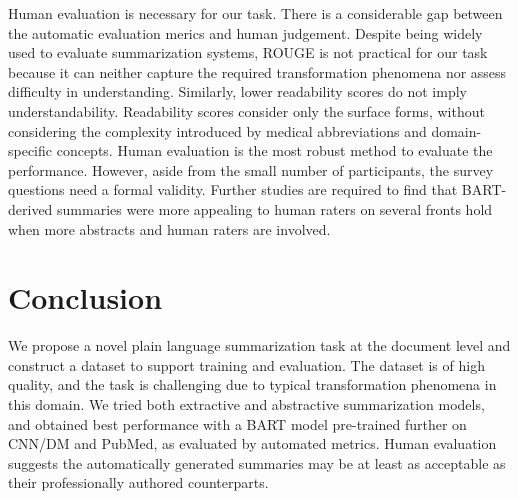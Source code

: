 \documentclass[letterpaper, table]{article} %
\begin{document}
Human evaluation is necessary for our task.
There is a considerable gap between the automatic evaluation merics 
and human judgement. 
Despite being widely used to evaluate summarization systems, ROUGE is not practical for our task because it can neither capture the required transformation phenomena nor assess difficulty in understanding. 
Similarly, lower readability scores do not imply understandability. 
Readability scores consider only the surface forms,
without considering the complexity introduced by medical abbreviations and domain-specific concepts. 
Human evaluation is the most robust method to evaluate the performance. 
However, aside from the small number of participants, 
the survey questions need a formal validity.
Further studies are required to find that BART-derived summaries were more appealing to human raters on several fronts hold when more abstracts and human raters are involved. 






\section{Conclusion}
We propose a novel plain language summarization task at the document level and construct a dataset to support training and evaluation. The dataset is of high quality, and the task is challenging due to typical transformation phenomena in this domain. We tried both extractive and abstractive summarization models, and obtained best performance with a BART model pre-trained further on CNN/DM and PubMed, as evaluated by automated metrics. Human evaluation suggests the automatically generated summaries may be at least as acceptable as their professionally authored counterparts.  

 

\newpage
{}

\end{document}
